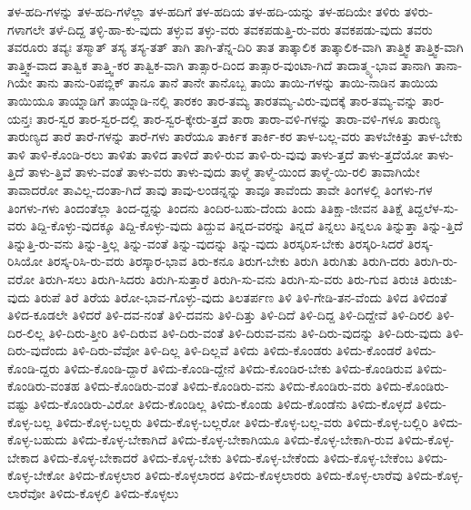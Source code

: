 {ತಳ-ಹದಿ-ಗಳನ್ನು
ತಳ-ಹದಿ-ಗಳೆಲ್ಲಾ
ತಳ-ಹದಿಗೆ
ತಳ-ಹದಿಯ
ತಳ-ಹದಿ-ಯನ್ನು
ತಳ-ಹದಿಯೇ
ತಳಿರು
ತಳಿರು-ಗಳಾಗಲೇ
ತಳೆ-ದಿದ್ದ
ತಳ್ಳಿ-ಹಾ-ಕು-ವುದು
ತಳ್ಳುವ
ತಳ್ಳು-ವರು
ತವಕಪಡುತ್ತಿ-ರು-ವರು
ತವಕಪಡು-ವುದು
ತವರು
ತವರೂರು
ತವ್ಯಃ
ತಸ್ಮಾತ್
ತಸ್ಯ
ತಸ್ಯ-ತತ್
ತಾಗಿ
ತಾಗಿ-ತೆನ್ನ-ದಿರಿ
ತಾತ
ತಾತ್ಕಾಲಿಕ
ತಾತ್ಕಾಲಿಕ-ವಾಗಿ
ತಾತ್ತ್ವಿಕ
ತಾತ್ತ್ವಿಕ-ವಾಗಿ
ತಾತ್ತ್ವಿಕ-ವಾದ
ತಾತ್ವಿಕ
ತಾತ್ತ್ವಿ-ಕರ
ತಾತ್ವಿಕ-ವಾಗಿ
ತಾತ್ಸಾರ-ದಿಂದ
ತಾತ್ಸಾರ-ವುಂಟಾ-ಗಿದೆ
ತಾದಾತ್ಮ್ಯ-ಭಾವ
ತಾನಾಗಿ
ತಾನಾ-ಗಿಯೇ
ತಾನು
ತಾನು-ರಿಪಬ್ಲಿಕ್
ತಾನೂ
ತಾನೆ
ತಾನೇ
ತಾನೊಬ್ಬ
ತಾಯಿ
ತಾಯಿ-ಗಳನ್ನು
ತಾಯಿ-ನಾಡಿನ
ತಾಯಿಯ
ತಾಯಿಯೂ
ತಾಯ್ನಾಡಿಗೆ
ತಾಯ್ನಾಡಿ-ನಲ್ಲಿ
ತಾರಕಂ
ತಾರ-ತಮ್ಯ
ತಾರತಮ್ಯ-ವಿರು-ವುದಕ್ಕೆ
ತಾರ-ತಮ್ಯ-ವನ್ನು
ತಾರ-ಯನ್ತಃ
ತಾರ-ಸ್ವರ
ತಾರ-ಸ್ವರ-ದಲ್ಲಿ
ತಾರ-ಸ್ವರ-ಕ್ಕೇರು-ತ್ತದೆ
ತಾರಾ
ತಾರಾ-ವಳಿ-ಗಳನ್ನು
ತಾರಾ-ವಳಿ-ಗಳೂ
ತಾರುಣ್ಯ
ತಾರುಣ್ಯದ
ತಾರೆ
ತಾರೆ-ಗಳನ್ನು
ತಾರೆ-ಗಳು
ತಾರೆಯೂ
ತಾರ್ಕಿಕ
ತಾರ್ಕಿ-ಕರ
ತಾಳ-ಬಲ್ಲ-ವರು
ತಾಳಬೇಕಿತ್ತು
ತಾಳ-ಬೇಕು
ತಾಳಿ
ತಾಳಿ-ಕೊಂಡಿ-ರಲು
ತಾಳಿತು
ತಾಳಿದ
ತಾಳಿದೆ
ತಾಳಿ-ರುವ
ತಾಳಿ-ರು-ವುವು
ತಾಳು-ತ್ತದೆ
ತಾಳು-ತ್ತದೆಯೋ
ತಾಳು-ತ್ತಿದೆ
ತಾಳು-ತ್ತಿವೆ
ತಾಳು-ವಂತೆ
ತಾಳು-ವರು
ತಾಳು-ವುದು
ತಾಳ್ಮೆ
ತಾಳ್ಮೆ-ಯಿಂದ
ತಾಳ್ಮೆ-ಯಿ-ರಲಿ
ತಾವಾಗಿಯೇ
ತಾವಾದರೋ
ತಾವಿಲ್ಲ-ದಂತಾ-ಗಿದೆ
ತಾವು
ತಾವು-ಲಂಡನ್ನನ್ನು
ತಾವೂ
ತಾವೆಂದು
ತಾವೇ
ತಿಂಗಳಲ್ಲಿ
ತಿಂಗಳು-ಗಳ
ತಿಂಗಳು-ಗಳು
ತಿಂದಂತೆಲ್ಲಾ
ತಿಂದ-ದ್ದನ್ನು
ತಿಂದನು
ತಿಂದಿರ-ಬಹು-ದೆಂದು
ತಿಂದು
ತಿತಿಕ್ಷಾ-ಜೀವನ
ತಿತಿಕ್ಷೆ
ತಿದ್ದಲೆಳ-ಸು-ವರು
ತಿದ್ದಿ-ಕೊಳ್ಳು-ವುದಕ್ಕೂ
ತಿದ್ದಿ-ಕೊಳ್ಳು-ವುದು
ತಿದ್ದುವ
ತಿನ್ನದ-ವರನ್ನು
ತಿನ್ನದೆ
ತಿನ್ನಲು
ತಿನ್ನಲೂ
ತಿನ್ನುತ್ತಾ
ತಿನ್ನು-ತ್ತಿದೆ
ತಿನ್ನುತ್ತಿ-ರು-ವನು
ತಿನ್ನು-ತ್ತಿಲ್ಲ
ತಿನ್ನು-ವಂತೆ
ತಿನ್ನು-ವುದನ್ನು
ತಿನ್ನು-ವುದು
ತಿರಸ್ಕರಿಸ-ಬೇಕು
ತಿರಸ್ಕರಿ-ಸಿದರೆ
ತಿರಸ್ಕ-ರಿಸಿಯೋ
ತಿರಸ್ಕ-ರಿಸಿ-ರು-ವರು
ತಿರಸ್ಕಾರ-ಭಾವ
ತಿರು-ಕನೂ
ತಿರುಗ-ಬೇಕು
ತಿರುಗಿ
ತಿರುಗಿತು
ತಿರುಗಿ-ದರು
ತಿರುಗಿ-ರು-ವರೋ
ತಿರುಗಿ-ಸಲು
ತಿರುಗಿ-ಸಿದರು
ತಿರುಗಿ-ಸುತ್ತಾರೆ
ತಿರುಗಿ-ಸು-ವನು
ತಿರುಗಿ-ಸು-ವರು
ತಿರು-ಗುವ
ತಿರುಚಿ
ತಿರುಚು-ವುದು
ತಿರುಪೆ
ತಿರೆ
ತಿರೆಯ
ತಿರೋ-ಭಾವ-ಗೊಳ್ಳು-ವುದು
ತಿಲತರ್ಪಣ
ತಿಳಿ
ತಿಳಿ-ಗೇಡಿ-ತನ-ವೆಂದು
ತಿಳಿದ
ತಿಳಿದಂತೆ
ತಿಳಿದ-ಕೂಡಲೇ
ತಿಳಿದರೆ
ತಿಳಿ-ದವ-ನಂತೆ
ತಿಳಿ-ದವನು
ತಿಳಿ-ದಿತ್ತು
ತಿಳಿ-ದಿದೆ
ತಿಳಿ-ದಿದ್ದ
ತಿಳಿ-ದಿದ್ದೇವೆ
ತಿಳಿ-ದಿರಲಿ
ತಿಳಿ-ದಿರ-ಲಿಲ್ಲ
ತಿಳಿ-ದಿರು-ತ್ತೀರಿ
ತಿಳಿ-ದಿರುವ
ತಿಳಿ-ದಿರು-ವಂತೆ
ತಿಳಿ-ದಿರುವ-ವನು
ತಿಳಿ-ದಿರು-ವುದನ್ನು
ತಿಳಿ-ದಿರು-ವುದು
ತಿಳಿ-ದಿರು-ವುದೆಂದು
ತಿಳಿ-ದಿರು-ವೆವೋ
ತಿಳಿ-ದಿಲ್ಲ
ತಿಳಿ-ದಿಲ್ಲವೆ
ತಿಳಿದು
ತಿಳಿದು-ಕೊಂಡರು
ತಿಳಿದು-ಕೊಂಡರೆ
ತಿಳಿದು-ಕೊಂಡಿ-ದ್ದರು
ತಿಳಿದು-ಕೊಂಡಿ-ದ್ದಾರೆ
ತಿಳಿದು-ಕೊಂಡಿ-ದ್ದೇನೆ
ತಿಳಿದು-ಕೊಂಡಿರ-ಬೇಕು
ತಿಳಿದು-ಕೊಂಡಿರುವ
ತಿಳಿದು-ಕೊಂಡಿರು-ವಂತಹ
ತಿಳಿದು-ಕೊಂಡಿರು-ವಂತೆ
ತಿಳಿದು-ಕೊಂಡಿರು-ವನು
ತಿಳಿದು-ಕೊಂಡಿರು-ವರು
ತಿಳಿದು-ಕೊಂಡಿರು-ವಷ್ಟು
ತಿಳಿದು-ಕೊಂಡಿರು-ವಿರೋ
ತಿಳಿದು-ಕೊಂಡಿಲ್ಲ
ತಿಳಿದು-ಕೊಂಡು
ತಿಳಿದು-ಕೊಂಡೆನು
ತಿಳಿದು-ಕೊಳ್ಳದೆ
ತಿಳಿದು-ಕೊಳ್ಳ-ಬಲ್ಲ
ತಿಳಿದು-ಕೊಳ್ಳ-ಬಲ್ಲರು
ತಿಳಿದು-ಕೊಳ್ಳ-ಬಲ್ಲರೋ
ತಿಳಿದು-ಕೊಳ್ಳ-ಬಲ್ಲ-ವರು
ತಿಳಿದು-ಕೊಳ್ಳ-ಬಲ್ಲಿರಿ
ತಿಳಿದು-ಕೊಳ್ಳ-ಬಹುದು
ತಿಳಿದು-ಕೊಳ್ಳ-ಬೇಕಾಗಿದೆ
ತಿಳಿದು-ಕೊಳ್ಳ-ಬೇಕಾಗಿಯೂ
ತಿಳಿದು-ಕೊಳ್ಳ-ಬೇಕಾಗಿ-ರುವ
ತಿಳಿದು-ಕೊಳ್ಳ-ಬೇಕಾದ
ತಿಳಿದು-ಕೊಳ್ಳ-ಬೇಕಾದರೆ
ತಿಳಿದು-ಕೊಳ್ಳ-ಬೇಕು
ತಿಳಿದು-ಕೊಳ್ಳ-ಬೇಕೆಂದು
ತಿಳಿದು-ಕೊಳ್ಳ-ಬೇಕೆಂಬ
ತಿಳಿದು-ಕೊಳ್ಳ-ಬೇಕೋ
ತಿಳಿದು-ಕೊಳ್ಳಲಾರ
ತಿಳಿದು-ಕೊಳ್ಳಲಾರದ
ತಿಳಿದು-ಕೊಳ್ಳಲಾರರು
ತಿಳಿದು-ಕೊಳ್ಳ-ಲಾರೆವು
ತಿಳಿದು-ಕೊಳ್ಳ-ಲಾರೆವೋ
ತಿಳಿದು-ಕೊಳ್ಳಲಿ
ತಿಳಿದು-ಕೊಳ್ಳಲು
}
